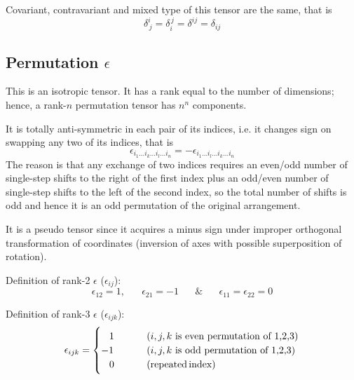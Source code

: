  Covariant, contravariant and mixed type of this tensor
are the same, that is
\begin{equation}
\delta_{\,j}^{i}=\delta_{i}^{\,j}=\delta^{ij}=\delta_{ij}
\end{equation}



\subsection{Permutation $\epsilon$\label{subPermutation}}

 This is an isotropic tensor. It has a rank equal to the
number of dimensions; hence, a rank-$n$ permutation tensor has $n^{n}$
components.

 It is totally anti-symmetric in each pair of its indices,
i.e. it changes sign on swapping any two of its indices, that is
\begin{equation}
\epsilon_{i_{1}\ldots i_{k}\ldots i_{l}\ldots i_{n}}=-\epsilon_{i_{1}\ldots i_{l}\ldots i_{k}\ldots i_{n}}
\end{equation}
The reason is that any exchange of two indices requires an even/odd
number of single-step shifts to the right of the first index plus
an odd/even number of single-step shifts to the left of the second
index, so the total number of shifts is odd and hence it is an odd
permutation of the original arrangement.

 It is a pseudo tensor since it acquires a minus sign under
improper orthogonal transformation of coordinates (inversion of axes
with possible superposition of rotation).

 Definition of rank-2 $\epsilon$ ($\epsilon_{ij}$):
\begin{equation}
\epsilon_{12}=1,\,\,\,\,\,\,\,\,\,\,\epsilon_{21}=-1\,\,\,\,\,\,\,\,\,\,\&\,\,\,\,\,\,\,\,\,\,\epsilon_{11}=\epsilon_{22}=0
\end{equation}


 Definition of rank-3 $\epsilon$ ($\epsilon_{ijk}$):
\begin{equation}
\epsilon_{ijk}=\begin{cases}
\,\,\,\,\,1 & (i,j,k\text{ is even permutation of 1,2,3})\\
-1 & (i,j,k\text{ is odd permutation of 1,2,3})\\
\,\,\,\,\,0\,\,\,\,\,\,\,\,\,\,\,\,\,\, & (\text{repeated\,index})
\end{cases}\label{eqEpsilon3Definition}
\end{equation}


